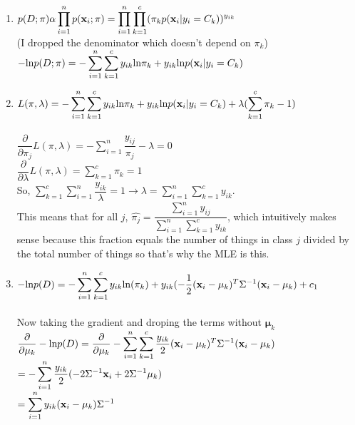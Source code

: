 \documentclass[submit]{harvardml}
\begin{document}
\begin{enumerate}
\item $p(D;\pi) \alpha \displaystyle\prod_{i=1}^{n}p(\mathbf{x}_i;\pi) = \displaystyle\prod_{i = 1}^{n}\prod_{k = 1}^{c}(\pi_kp(\mathbf{x}_i | y_i = C_k))^{y_{ik}}$ \\ (I dropped the denominator which doesn't depend on $\pi_k$)
$-\textup{ln}p(D;\pi) = -\displaystyle\sum_{i=1}^{n}\sum_{k=1}^{c}y_{ik}\textup{ln}\pi_k + y_{ik}\textup{ln}p(\mathbf{x}_i | y_i = C_k)$ 
\item $L(\pi,\lambda) =  -\displaystyle\sum_{i=1}^{n}\sum_{k=1}^{c}y_{ik}\textup{ln}\pi_k + y_{ik}\textup{ln}p(\mathbf{x}_i | y_i = C_k) + \lambda(\displaystyle\sum_{k = 1}^{c}\pi_k - 1)$ \\\\
$\dfrac{\partial}{\partial \pi_j}L(\pi, \lambda) = -\displaystyle\sum_{i = 1}^{n}\dfrac{y_{ij}}{\pi_j} - \lambda = 0$ \\
$\dfrac{\partial}{\partial \lambda}L(\pi, \lambda) = \displaystyle\sum_{k = 1}^{c}\pi_k = 1$ \\
So, $\displaystyle\sum_{k = 1}^{c}\sum_{i = 1}^{n}\dfrac{y_{ik}}{\lambda} = 1 \to \lambda = \sum_{i = 1}^{n}\sum_{k = 1}^{c}y_{ik}$. \\
This means that for all $j$, $\hat{\pi_j} = \dfrac{\displaystyle\sum_{i=1}^{n}y_{ij}}{\displaystyle\sum_{i=1}^{n}\sum_{k=1}^{c}y_{ik}}$, which intuitively makes sense because this fraction equals the number of things in class $j$ divided by the total number of things so that's why the MLE is this.  

\item $-\textup{ln}p(D) = -\displaystyle\sum_{i=1}^{n}\sum_{k=1}^{c}y_{ik}\textup{ln}(\pi_k) +y_{ik}(-\frac{1}{2}(\mathbf{x}_i-\mathbf{\mu}_k)^T\Sigma^{-1}(\mathbf{x}_i - \mathbf{\mu}_k) + c_1$ \\\\
Now taking the gradient and droping the terms without $\mathbf{\mu}_k$ \\
$\dfrac{\partial}{\partial\mathbf{\mu}_k}-\textup{ln}p(D) = \dfrac{\partial}{\partial\mathbf{\mu}_k}-\displaystyle\sum_{i=1}^{n}\sum_{k=1}^{c} \frac{y_{ik}}{2} (\mathbf{x}_i-\mathbf{\mu}_k)^T\Sigma^{-1}(\mathbf{x}_i - \mathbf{\mu}_k)$ \\
$ = -\displaystyle\sum_{i = 1}^{n}\dfrac{y_{ik}}{2}(-2\Sigma^{-1}\mathbf{x}_i+2\Sigma^{-1}\mathbf{\mu}_k) $\\
$ = \displaystyle\sum_{i=1}^{n}y_{ik}(\mathbf{x}_i - \mathbf{\mu}_k)\Sigma^{-1}$ \\


\end{enumerate}
\end{document}
